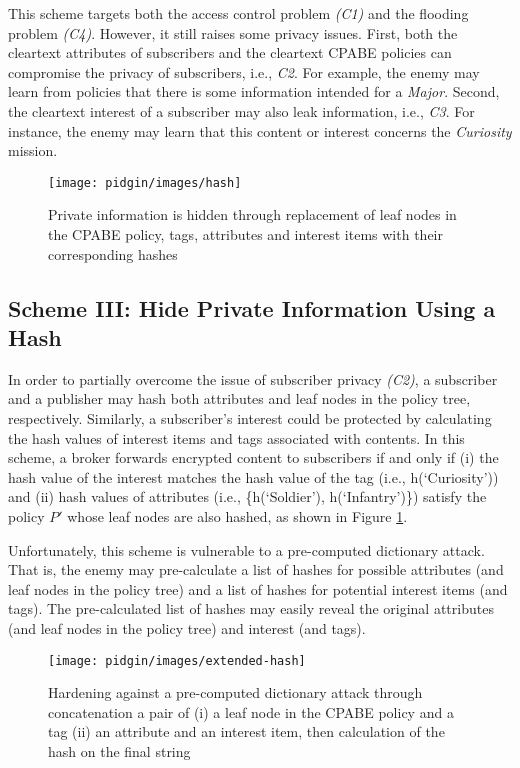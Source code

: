 \documentclass[epsfig,a4paper,11pt,titlepage]{book}
\numberwithin{algorithm}{chapter}
\begin{document}
This scheme targets both the access control problem \textit{(C1)} and the flooding problem \textit{(C4)}. However, it still raises some privacy issues. First, both the cleartext attributes of subscribers and the cleartext \gls{CPABE} policies can compromise the privacy of subscribers, i.e., \textit{C2}. For example, the enemy may learn from policies that there is some information intended for a \emph{Major}. Second, the cleartext interest of a subscriber may also leak information, i.e., \textit{C3}. For instance, the enemy may learn that this content or interest concerns the \emph{Curiosity} mission.

\begin{figure} [htp]
\centering
\texttt{[image: pidgin/images/hash]}
\caption[Hiding private information using hash functions]{Private information is hidden through replacement of leaf nodes in the \gls{CPABE} policy, tags, attributes and interest items with their corresponding hashes}
\label{fig:pidgin-hash}
\end{figure}

\subsection{Scheme III: Hide Private Information Using a Hash}
In order to partially overcome the issue of subscriber privacy \textit{(C2)}, a subscriber and a publisher may hash both attributes and leaf nodes in the policy tree, respectively. Similarly, a subscriber's interest could be protected by calculating the hash values of interest items and tags associated with contents. In this scheme, a broker forwards encrypted content to subscribers if and only if (i) the hash value of the interest matches the hash value of the tag (i.e., h(`Curiosity')) and (ii) hash values of attributes (i.e., \{h(`Soldier'), h(`Infantry')\}) satisfy the policy $P'$ whose leaf nodes are also hashed, as shown in Figure \ref{fig:pidgin-hash}.

Unfortunately, this scheme is vulnerable to a pre-computed dictionary attack. That is, the enemy may pre-calculate a list of hashes for possible attributes (and leaf nodes in the policy tree) and a list of hashes for potential interest items (and tags). The pre-calculated list of hashes may easily reveal the original attributes (and leaf nodes in the policy tree) and interest (and tags).

\begin{figure} [htp]
\centering
\texttt{[image: pidgin/images/extended-hash]}
\caption[Hardening against a pre-computed dictionary attack]{Hardening against a pre-computed dictionary attack through concatenation a pair of (i) a leaf node in the \gls{CPABE} policy and a tag (ii) an attribute and an interest item, then calculation of the hash on the final string}
\label{fig:pidgin-extended-hash}
\end{figure}
\end{document}
